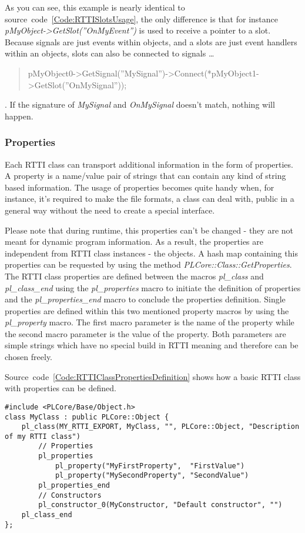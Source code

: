 As you can see, this example is nearly identical to source~code~\ref{Code:RTTISlotsUsage}, the only difference is that for instance \emph{pMyObject->GetSlot(''OnMyEvent'')} is used to receive a pointer to a slot. Because signals are just events within objects, and a slots are just event handlers within an objects, slots can also be connected to signals \ldots \begin{quote}pMyObject0->GetSignal(''MySignal'')->Connect(*pMyObject1->GetSlot(''OnMySignal''));\end{quote}. If the signature of \emph{MySignal} and \emph{OnMySignal} doesn't match, nothing will happen.



\subsubsection{Properties}
Each RTTI class can transport additional information in the form of properties. A property is a name/value pair of strings that can contain any kind of string based information. The usage of properties becomes quite handy when, for instance, it's required to make the file formats, a class can deal with, public in a general way without the need to create a  special interface.

Please note that during runtime, this properties can't be changed - they are not meant for dynamic program information. As a result, the properties are independent from RTTI class instances - the objects. A hash map containing this properties can be requested by using the method \emph{PLCore::Class::GetProperties}. The RTTI class properties are defined between the macros \emph{pl\_class} and \emph{pl\_class\_end} using the \emph{pl\_properties} macro to initiate the definition of properties and the \emph{pl\_properties\_end} macro to conclude the properties definition. Single properties are defined within this two mentioned property macros by using the \emph{pl\_property} macro. The first macro parameter is the name of the property while the second macro parameter is the value of the property. Both parameters are simple strings which have no special build in RTTI meaning and therefore can be chosen freely.

Source~code~\ref{Code:RTTIClassPropertiesDefinition} shows how a basic RTTI class with properties can be defined.
\begin{lstlisting}[float=htb,label=Code:RTTIClassPropertiesDefinition,caption={Defining a new RTTI class with properties}]
#include <PLCore/Base/Object.h>
class MyClass : public PLCore::Object {
	pl_class(MY_RTTI_EXPORT, MyClass, "", PLCore::Object, "Description of my RTTI class")
		// Properties
		pl_properties
			pl_property("MyFirstProperty",  "FirstValue")
			pl_property("MySecondProperty", "SecondValue")
		pl_properties_end
		// Constructors
		pl_constructor_0(MyConstructor, "Default constructor", "")
	pl_class_end
};
\end{lstlisting}

